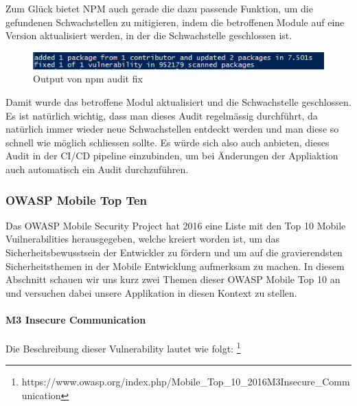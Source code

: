 Zum Glück bietet NPM auch gerade die dazu passende Funktion, um die gefundenen Schwachstellen zu mitigieren, indem die betroffenen Module auf eine Version aktualisiert werden, in der die Schwachstelle geschlossen ist.

\begin{figure}[H]
    \centering
    \includegraphics[width=\textwidth]{images/fixed_vulnerability.PNG}
    \caption{Output von npm audit fix}
    \label{fig:vulnerability_fixed}
\end{figure}

Damit wurde das betroffene Modul aktualisiert und die Schwachstelle geschlossen.
\newline
Es ist natürlich wichtig, dass man dieses Audit regelmässig durchführt, da natürlich immer wieder neue Schwachstellen entdeckt werden und man diese so schnell wie möglich schliessen sollte. Es würde sich also auch anbieten, dieses Audit in der CI/CD pipeline einzubinden, um bei Änderungen der Appliaktion auch automatisch ein Audit durchzuführen.


\subsubsection{OWASP Mobile Top Ten}
Das OWASP Mobile Security Project hat 2016 eine Liste mit den Top 10 Mobile Vuilnerabilities herausgegeben, welche kreiert worden ist, um das Sicherheitsbewusstsein der Entwickler zu fördern und um auf die gravierendsten Sicherheitsthemen in der Mobile Entwicklung aufmerksam zu machen. In diesem Abschnitt schauen wir uns kurz zwei Themen dieser OWASP Mobile Top 10 an und versuchen dabei unsere Applikation in diesen Kontext zu stellen.

\paragraph{M3 Insecure Communication}
Die Beschreibung dieser Vulnerability lautet wie folgt: \textit{}\footnote{https://www.owasp.org/index.php/Mobile\_Top\_10\_2016\-M3\-Insecure\_Communication}

